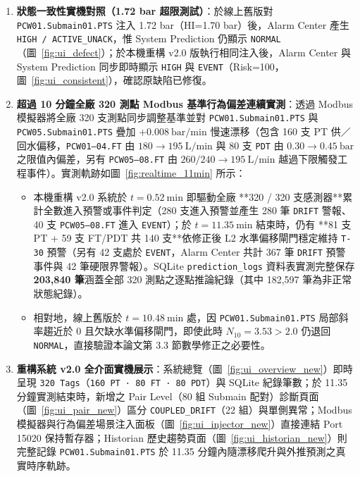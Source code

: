 \documentclass[fontset=none, a4paper, 12pt]{ctexart}
\begin{document}
\begin{doublespace}
\begin{enumerate}
    \item \textbf{狀態一致性實機對照（1.72 bar 超限測試）}：於線上舊版對 \texttt{PCW01.Submain01.PTS} 注入 1.72 bar（HI=1.70 bar）後，Alarm Center 產生 \texttt{HIGH / ACTIVE\_UNACK}，惟 System Prediction 仍顯示 \texttt{NORMAL}（圖~\ref{fig:ui_defect}）；於本機重構 v2.0 版執行相同注入後，Alarm Center 與 System Prediction 同步即時顯示 \texttt{HIGH} 與 \texttt{EVENT}（Risk=100，圖~\ref{fig:ui_consistent}），確認原缺陷已修復。
    \item \textbf{超過 10 分鐘全廠 320 測點 Modbus 基準行為偏差連續實測}：透過 Modbus 模擬器將全廠 320 支測點同步調整基準並對 \texttt{PCW01.Submain01.PTS} 與 \texttt{PCW05.Submain01.PTS} 疊加 $+0.008\ \mathrm{bar/min}$ 慢速漂移（包含 160 支 PT 供／回水偏移，\texttt{PCW01–04.FT} 由 $180\to 195\ \mathrm{L/min}$ 與 80 支 \texttt{PDT} 由 $0.30\to 0.45\ \mathrm{bar}$ 之限值內偏差，另有 \texttt{PCW05–08.FT} 由 $260/240\to 195\ \mathrm{L/min}$ 越過下限觸發工程事件）。實測軌跡如圖~\ref{fig:realtime_11min} 所示：
    \begin{itemize}
        \item 本機重構 v2.0 系統於 $t=0.52\ \mathrm{min}$ 即驅動全廠 **320 / 320 支感測器**累計全數進入預警或事件判定（280 支進入預警並產生 280 筆 \texttt{DRIFT} 警報、40 支 \texttt{PCW05–08.FT} 進入 \texttt{EVENT}）；於 $t=11.35\ \mathrm{min}$ 結束時，仍有 **81 支 PT + 59 支 FT/PDT 共 140 支**依修正後 L2 水準偏移閘門穩定維持 \texttt{T-30} 預警（另有 42 支處於 \texttt{EVENT}，Alarm Center 共計 367 筆 \texttt{DRIFT} 預警事件與 42 筆硬限界警報）。SQLite \texttt{prediction\_logs} 資料表實測完整保存 \textbf{203,840 筆}涵蓋全部 320 測點之逐點推論紀錄（其中 182,597 筆為非正常狀態紀錄）。
        \item 相對地，線上舊版於 $t=10.48\ \mathrm{min}$ 處，因 \texttt{PCW01.Submain01.PTS} 局部斜率趨近於 0 且欠缺水準偏移閘門，即使此時 $N_{10}=3.53 > 2.0$ 仍退回 \texttt{NORMAL}，直接驗證本論文第 3.3 節數學修正之必要性。
    \end{itemize}
    \item \textbf{重構系統 v2.0 全介面實機展示}：系統總覽（圖~\ref{fig:ui_overview_new}）即時呈現 \texttt{320 Tags}（\texttt{160 PT · 80 FT · 80 PDT}）與 SQLite 紀錄筆數；於 11.35 分鐘實測結束時，新增之 Pair Level（80 組 Submain 配對）診斷頁面（圖~\ref{fig:ui_pair_new}）區分 \texttt{COUPLED\_DRIFT}（22 組）與單側異常；Modbus 模擬器與行為偏差場景注入面板（圖~\ref{fig:ui_injector_new}）直接連結 Port 15020 保持暫存器；Historian 歷史趨勢頁面（圖~\ref{fig:ui_historian_new}）則完整記錄 \texttt{PCW01.Submain01.PTS} 於 11.35 分鐘內隨漂移爬升與外推預測之真實時序軌跡。
\end{enumerate}


\end{doublespace}
\end{document}
